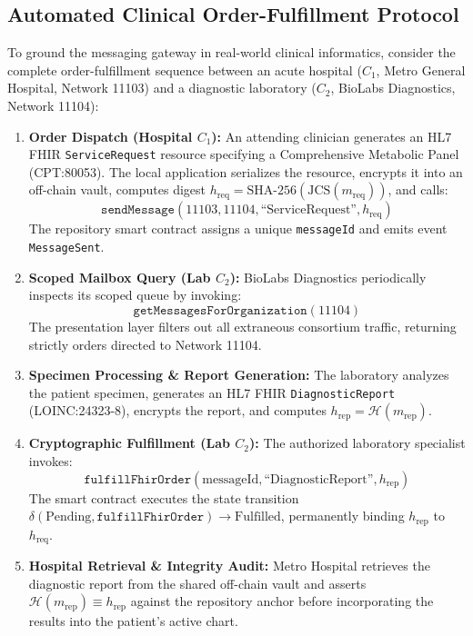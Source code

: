 \subsection{Automated Clinical Order-Fulfillment Protocol}
To ground the messaging gateway in real-world clinical informatics, consider the complete order-fulfillment sequence between an acute hospital ($C_1$, Metro General Hospital, Network 11103) and a diagnostic laboratory ($C_2$, BioLabs Diagnostics, Network 11104):
\begin{enumerate}
    \item \textbf{Order Dispatch (Hospital $C_1$):} An attending clinician generates an HL7 FHIR \texttt{ServiceRequest} resource specifying a Comprehensive Metabolic Panel (CPT:80053). The local application serializes the resource, encrypts it into an off-chain vault, computes digest $h_{\text{req}} = \text{SHA-256}(\text{JCS}(m_{\text{req}}))$, and calls:
    \begin{equation}
    \texttt{sendMessage}(11103, 11104, \text{``ServiceRequest''}, h_{\text{req}})
    \end{equation}
    The repository smart contract assigns a unique \texttt{messageId} and emits event \texttt{MessageSent}.
    \item \textbf{Scoped Mailbox Query (Lab $C_2$):} BioLabs Diagnostics periodically inspects its scoped queue by invoking:
    \begin{equation}
    \texttt{getMessagesForOrganization}(11104)
    \end{equation}
    The presentation layer filters out all extraneous consortium traffic, returning strictly orders directed to Network 11104.
    \item \textbf{Specimen Processing \& Report Generation:} The laboratory analyzes the patient specimen, generates an HL7 FHIR \texttt{DiagnosticReport} (LOINC:24323-8), encrypts the report, and computes $h_{\text{rep}} = \mathcal{H}(m_{\text{rep}})$.
    \item \textbf{Cryptographic Fulfillment (Lab $C_2$):} The authorized laboratory specialist invokes:
    \begin{equation}
    \texttt{fulfillFhirOrder}(\text{messageId}, \text{``DiagnosticReport''}, h_{\text{rep}})
    \end{equation}
    The smart contract executes the state transition $\delta(\text{Pending}, \texttt{fulfillFhirOrder}) \to \text{Fulfilled}$, permanently binding $h_{\text{rep}}$ to $h_{\text{req}}$.
    \item \textbf{Hospital Retrieval \& Integrity Audit:} Metro Hospital retrieves the diagnostic report from the shared off-chain vault and asserts $\mathcal{H}(m_{\text{rep}}) \equiv h_{\text{rep}}$ against the repository anchor before incorporating the results into the patient's active chart.
\end{enumerate}

